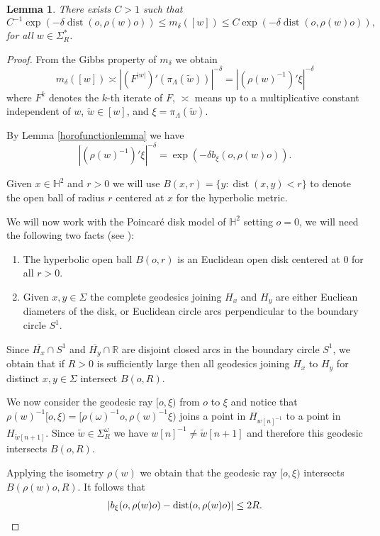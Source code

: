 \documentclass{article}
\newtheorem{lemma}{Lemma}
\DeclareMathOperator{\dist}{dist}
\newcommand{\R}{\mathbb{R}}
\renewcommand{\H}{\mathbb{H}}
\begin{document}
\begin{lemma}\label{bowenmeasurelemma}
  There exists \(C > 1\) such that
  \[C^{-1}\exp(-\delta \dist(o,\rho(w)o)) \le m_\delta([w]) \le C\exp(-\delta\dist(o,\rho(w)o)),\]
  for all \(w \in \Sigma^*_R\).
\end{lemma}
\begin{proof}
From the Gibbs property of \(m_\delta\) we obtain
\[m_\delta([w]) \asymp |(F^{|w|})'(\pi_{\Lambda}(\tilde{w}))|^{-\delta} = |(\rho(w)^{-1})'\xi|^{-\delta}\]
where \(F^k\) denotes the \(k\)-th iterate of \(F\), \(\asymp\) means up to a multiplicative constant independent of \(w\), \(\tilde{w} \in [w]\), and \(\xi = \pi_\Lambda(\tilde{w})\).

By Lemma \ref{horofunctionlemma} we have
 \[|(\rho(w)^{-1})'\xi|^{-\delta} = \exp(-\delta b_\xi(o,\rho(w)o)).\]

Given \(x \in \H^2\) and \(r > 0\) we will use \(B(x,r) = \lbrace y: \dist(x,y) < r\rbrace\) to denote the open ball of radius \(r\) centered at \(x\) for the hyperbolic metric.    

We will now work with the Poincaré disk model of \(\H^2\) setting \(o = 0\), we will need the following two facts (see \cite[Chapter 4]{anderson}):
\begin{enumerate}
    \item The hyperbolic open ball \(B(o,r)\) is an Euclidean open disk centered at \(0\) for all \(r > 0\).
    \item Given \(x,y \in \Sigma\) the complete geodesics joining \(H_x\) and \(H_y\) are either Eucliean diameters of the disk, or Euclidean circle arcs perpendicular to the boundary circle \(S^1\).
\end{enumerate}   

Since \(\overline{H_x}\cap S^1\) and \(\overline{H_y}\cap \R\) are disjoint closed arcs in the boundary circle \(S^1\), we obtain that if \(R > 0\) is sufficiently large then all geodesics joining \(H_x\) to \(H_y\) for distinct \(x,y \in \Sigma\) intersect \(B(o,R)\).    

We now consider the geodesic ray \([o,\xi)\) from \(o\) to \(\xi\) and notice that \(\rho(w)^{-1}[o,\xi) = [\rho(\omega)^{-1}o, \rho(w)^{-1}\xi)\) joins a point in \(H_{w[n]^{-1}}\) to a point in \(H_{\tilde{w}[n+1]}\).  Since \(\tilde{w} \in \Sigma^\omega_R\) we have \(w[n]^{-1} \neq \tilde{w}[n+1]\) and therefore this geodesic intersects \(B(o,R)\).

Applying the isometry \(\rho(w)\) we obtain that the geodesic ray \([o,\xi)\) intersects \(B(\rho(w)o,R)\).  It follows that
\[|b_\xi(o,\rho(w)o) - \dist(o,\rho(w)o)| \le 2R.\qedhere\]
\end{proof}
\end{document}

